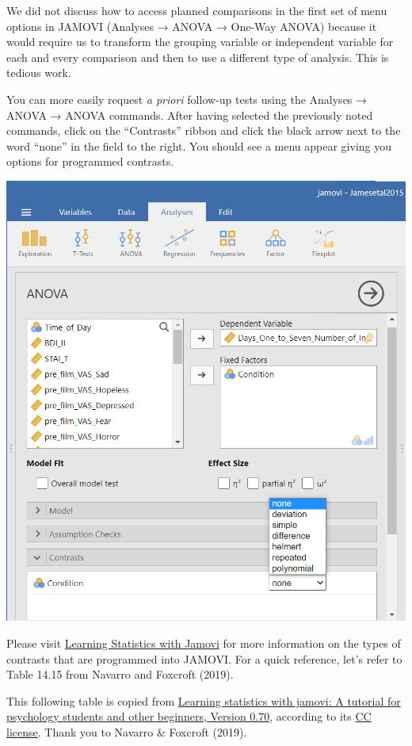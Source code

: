 \documentclass[
]{book}
\begin{document}
We did not discuss how to access planned comparisons in the first set of menu options in JAMOVI ({Analyses} → {ANOVA} → {One-Way ANOVA}) because it would require us to transform the grouping variable or independent variable for each and every comparison and then to use a different type of analysis. This is tedious work.

You can more easily request \emph{a priori} follow-up tests using the {Analyses} → {ANOVA} → {ANOVA} commands. After having selected the previously noted commands, click on the ``Contrasts'' ribbon and click the black arrow next to the word ``none'' in the field to the right. You should see a menu appear giving you options for programmed contrasts.

\includegraphics{img/ANOVAPlannedContrastsOptions.png}

Please visit \href{https://davidfoxcroft.github.io/lsj-book/}{Learning Statistics with Jamovi} for more information on the types of contrasts that are programmed into JAMOVI. For a quick reference, let's refer to Table 14.15 from Navarro and Foxcroft (2019).

This following table is copied from \href{https://www.learnstatswithjamovi.com/}{Learning statistics with jamovi: A tutorial for psychology students and other beginners, Version 0.70}, according to its \href{https://creativecommons.org/licenses/by-sa/4.0/deed.ast}{CC license}. Thank you to Navarro \& Foxcroft (2019).
\end{document}
